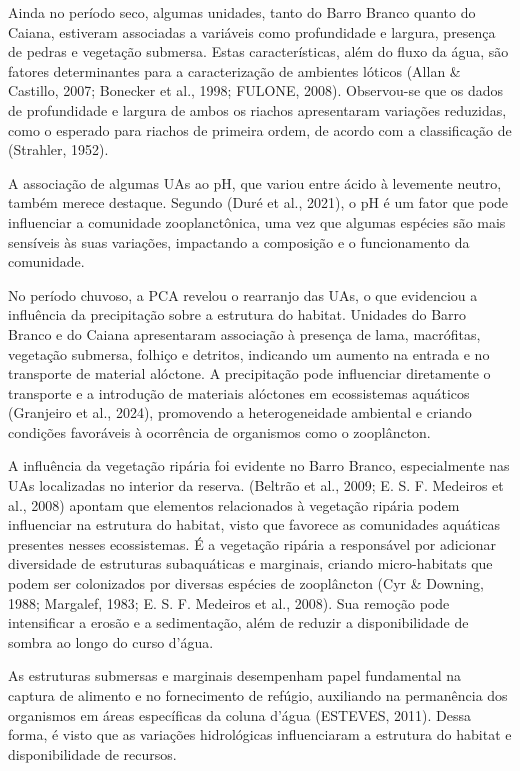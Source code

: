 \documentclass[
  letterpaper,
  DIV=11,
  numbers=noendperiod]{scrartcl}
\begin{document}
Ainda no período seco, algumas unidades, tanto do Barro Branco quanto do
Caiana, estiveram associadas a variáveis como profundidade e largura,
presença de pedras e vegetação submersa. Estas características, além do
fluxo da água, são fatores determinantes para a caracterização de
ambientes lóticos (Allan \& Castillo, 2007; Bonecker et al., 1998;
FULONE, 2008). Observou-se que os dados de profundidade e largura de
ambos os riachos apresentaram variações reduzidas, como o esperado para
riachos de primeira ordem, de acordo com a classificação de (Strahler,
1952).

A associação de algumas UAs ao pH, que variou entre ácido à levemente
neutro, também merece destaque. Segundo (Duré et al., 2021), o pH é um
fator que pode influenciar a comunidade zooplanctônica, uma vez que
algumas espécies são mais sensíveis às suas variações, impactando a
composição e o funcionamento da comunidade.

No período chuvoso, a PCA revelou o rearranjo das UAs, o que evidenciou
a influência da precipitação sobre a estrutura do habitat. Unidades do
Barro Branco e do Caiana apresentaram associação à presença de lama,
macrófitas, vegetação submersa, folhiço e detritos, indicando um aumento
na entrada e no transporte de material alóctone. A precipitação pode
influenciar diretamente o transporte e a introdução de materiais
alóctones em ecossistemas aquáticos (Granjeiro et al., 2024), promovendo
a heterogeneidade ambiental e criando condições favoráveis à ocorrência
de organismos como o zooplâncton.

A influência da vegetação ripária foi evidente no Barro Branco,
especialmente nas UAs localizadas no interior da reserva. (Beltrão et
al., 2009; E. S. F. Medeiros et al., 2008) apontam que elementos
relacionados à vegetação ripária podem influenciar na estrutura do
habitat, visto que favorece as comunidades aquáticas presentes nesses
ecossistemas. É a vegetação ripária a responsável por adicionar
diversidade de estruturas subaquáticas e marginais, criando
micro-habitats que podem ser colonizados por diversas espécies de
zooplâncton (Cyr \& Downing, 1988; Margalef, 1983; E. S. F. Medeiros et
al., 2008). Sua remoção pode intensificar a erosão e a sedimentação,
além de reduzir a disponibilidade de sombra ao longo do curso d'água.

As estruturas submersas e marginais desempenham papel fundamental na
captura de alimento e no fornecimento de refúgio, auxiliando na
permanência dos organismos em áreas específicas da coluna d'água
(ESTEVES, 2011). Dessa forma, é visto que as variações hidrológicas
influenciaram a estrutura do habitat e disponibilidade de recursos.
\end{document}
